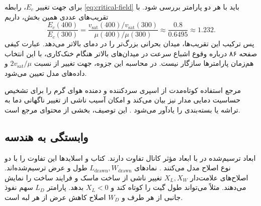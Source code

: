 برای جهت تغییر \(E_c\)، رابطه \eqref{eq:critical-field} باید با هر
دو پارامتر بررسی شود. با تقریب‌های عددی همین بخش، داریم
\begin{equation*}
 \frac{E_c(400)}{E_c(300)}
 =\frac{v_{\mathrm{sat}}(400)/v_{\mathrm{sat}}(300)}
        {\mu(400)/\mu(300)}
 \approx\frac{0.8}{0.6495}\approx1.232.
\end{equation*}
پس ترکیب این تقریب‌ها، میدان بحرانی بزرگ‌تر را در دمای بالاتر
می‌دهد. عبارت کیفی صفحه ۸۶ درباره وقوع اشباع سرعت در میدان‌های
بالاتر هنگام خنک‌کاری، با این انتخاب هم‌زمان پارامترها سازگار
نیست. در محاسبه این جزوه، جهت تغییر از نسبت
\(2v_{\mathrm{sat}}/\mu\) و داده‌های مدل تعیین می‌شود.

مرجع استفاده کوتاه‌مدت از اسپری سردکننده و دمنده هوای گرم را برای
تشخیص حساسیت دمایی مدار نیز بیان می‌کند و امکان آسیب ناشی از تغییر
ناگهانی دما به تراشه یا بسته‌بندی را یادآور می‌شود
\cite[صفحه ۸۶]{weste}. این توصیف، بخشی از محتوای مرجع است.

\clearpage
\subsection{وابستگی به هندسه}
\label{sec:geometry-dependence}
ابعاد ترسیم‌شده در  با ابعاد مؤثر کانال تفاوت دارند.
کتاب و اسلایدها این تفاوت را با دو نوع اصلاح مدل می‌کنند
\cite[بخش ، صفحه ۸۶]{weste}
\cite[اسلایدهای ۳۵ و ۳۶]{nonideal}. نمادهای
\(L_{\mathrm{drawn}},W_{\mathrm{drawn}}\) طول و عرض ترسیم‌شده‌اند.
اصلاح‌های علامت‌دار \(X_L,X_W\) تغییر ناشی از ساخت ماسک و فرایند
ساخت را نمایش می‌دهند. مثلاً  می‌تواند طول گیت را
کوتاه کند و \(X_L<0\) بدهد. پارامتر \(L_D\) سهم نفوذ جانبی از هر
طرف و \(W_D\) اصلاح کاهش عرض از هر لبه است.

